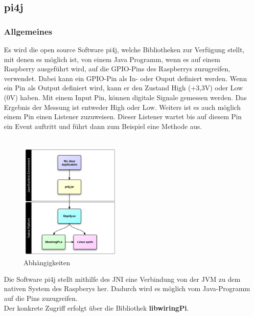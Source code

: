\subsection{pi4j} \label{subsec:pi4j}
\subsubsection{Allgemeines}
Es wird die open source Software \ac{pi4j}, welche Bibliotheken zur Verfügung stellt, mit denen es möglich ist, von einem Java Programm, wenn es auf einem Raspberry ausgeführt wird, auf die \ac{GPIO}-Pins des Raspberrys zuzugreifen, verwendet. Dabei kann ein \ac{GPIO}-Pin als In- oder Ouput definiert werden. Wenn ein Pin als Output definiert wird, kann er den Zustand High (+3,3V) oder Low (0V) haben. Mit einem Input Pin, können digitale Signale gemessen werden. Das Ergebnis der Messung ist entweder High oder Low. Weiters ist es auch möglich einem Pin einen Listener zuzuweisen. Dieser Listener wartet bis auf diesem Pin ein Event auftritt und führt dann zum Beispiel eine Methode aus. 
\\ \\

\begin{figure}
\vspace{-35pt}
  \begin{center}
    \includegraphics[width=0.45\textwidth]{Bilder/pi4j/dependencies}
  \end{center}
  \caption[Abhängigkeiten]{Abhängigkeiten\protect\footnotemark}
  \label{Abhaengigkeiten}
  \vspace{-160pt}
\end{figure}


Die Software \ac{pi4j} stellt mithilfe des \ac{JNI} eine Verbindung von der \ac{JVM} zu dem nativen System des Raspberys her. Dadurch wird es möglich vom Java-Programm auf die Pins zuzugreifen.
\\ Der konkrete Zugriff erfolgt über die Bibliothek \textbf{libwiringPi}.


